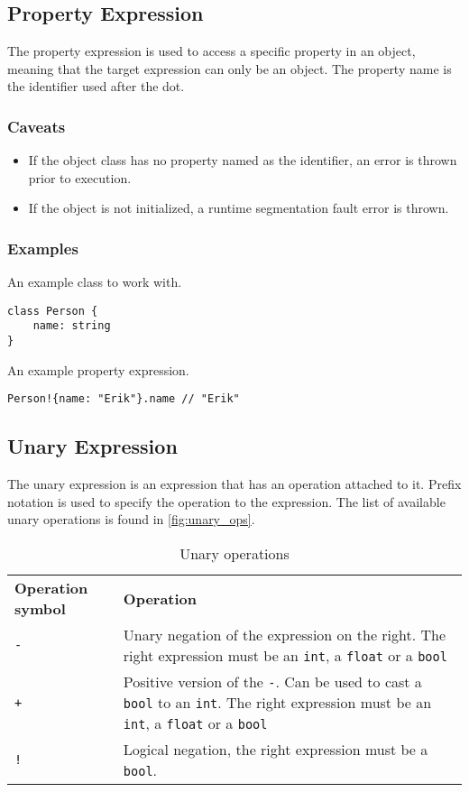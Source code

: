 \subsection{Property Expression}

The property expression is used to access a specific property in an object, meaning that the target expression can only be
an object. The property name is the identifier used after the dot.

\subsubsection{Caveats}

\begin{itemize}
    \item If the object class has no property named as the identifier, an error is thrown prior to execution.
    \item If the object is not initialized, a runtime segmentation fault error is thrown.
\end{itemize}

\subsubsection{Examples}

An example class to work with.
\begin{lstlisting}
class Person {
    name: string
}
\end{lstlisting}
An example property expression.
\begin{lstlisting}
Person!{name: "Erik"}.name // "Erik"
\end{lstlisting}

\subsection{Unary Expression}

The unary expression is an expression that has an operation attached to it. Prefix notation is used to specify the operation
to the expression. The list of available unary operations is found in \autoref{fig:unary_ops}.

\begin{table}[H]
    \centering
    \begin{tabular}{ l p{7.5cm} }
        \textbf{Operation symbol} & \textbf{Operation} \\
        \texttt{-} & Unary negation of the expression on the right. The right expression must be an \texttt{int}, a \texttt{float} or a \texttt{bool}\\
        \texttt{+} & Positive version of the \texttt{-}. Can be used to cast a \texttt{bool} to an \texttt{int}.
            The right expression must be an \texttt{int}, a \texttt{float} or a \texttt{bool}\\
        \texttt{!} & Logical negation, the right expression must be a \texttt{bool}.\\
    \end{tabular}
    \caption{Unary operations}
    \label{fig:unary_ops}
\end{table}

